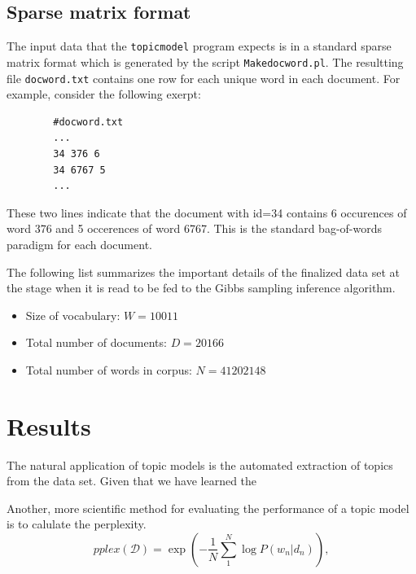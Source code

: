 \documentclass[11pt]{article}
\newcommand{\file}[1]{\texttt{#1}}
\newcommand{\program}[1]{\texttt{#1}}
\newcommand{\DD}{\mathcal{D}}
\begin{document}
    \subsection{Sparse matrix format}

        The input data that the \program{topicmodel} program expects is in a standard sparse 
        matrix format which is generated by the script \program{Makedocword.pl}.
        The resultting file \file{docword.txt} contains one row for each unique word
        in each document. For example, consider the following exerpt:
        \begin{verbatim}
        #docword.txt
        ...
        34 376 6
        34 6767 5
        ...
        \end{verbatim}
        These two lines indicate that the document with id=34 contains 6 occurences of word 376
        and 5 occerences of word 6767.
        This is the standard bag-of-words paradigm for each document.


    The following list summarizes the important details of the finalized data set 
    at the stage when it is read to be fed to the Gibbs sampling inference algorithm.
	\begin{itemize}
        \item Size of vocabulary: $W=10011$  
        \item Total number of documents: $D=20166$ 
        \item Total number of words in corpus: $N=41202148$
	\end{itemize}



\section{Results} \label{section:results}
	

    The natural application of topic models is the automated extraction of topics from
    the data set. 
    Given that we have learned the 


    Another, more scientific method for evaluating the performance of a topic model 
    is to calulate the perplexity.
    \begin{equation}
        pplex\!\left(\DD\right) = \exp\left( - \frac{1}{N} \sum_1^N \log P(w_n|d_n) \right),
    \end{equation}
\end{document}
